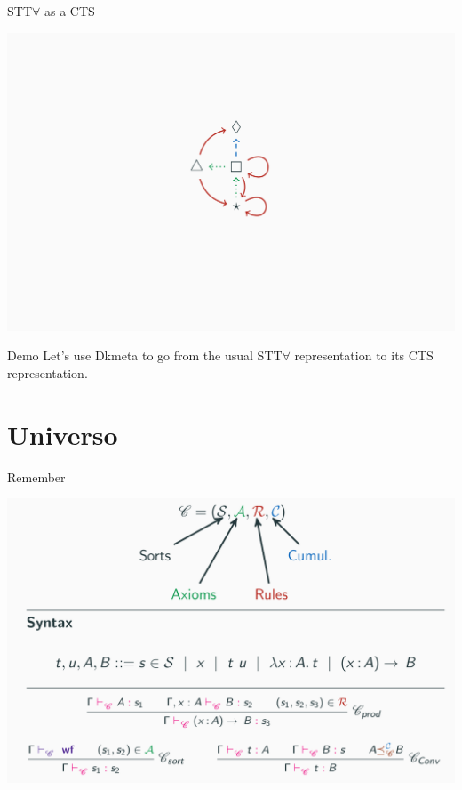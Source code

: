\documentclass[usenames, dvipsnames]{beamer}
\begin{document}
\begin{frame}{STT\(\forall\) as a CTS}
  \begin{center}    
    \includegraphics[scale=0.2]{images/sttfa_cts.png}
  \end{center}    
\end{frame}

\begin{frame}{Demo}
  \large{Let's use Dkmeta to go from the usual STT\(\forall\)
    representation to its CTS representation.}
\end{frame}

\section{Universo}

\begin{frame}{Remember}
  \begin{center}    
    \includegraphics[scale=0.2]{images/cts.png}
  \end{center}    
\end{frame}
\end{document}
